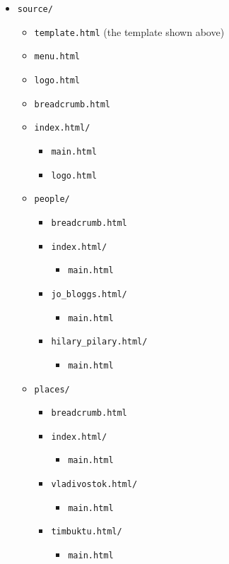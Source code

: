 \documentclass[english]{scrartcl}
\begin{document}
\begin{enumerate}
\begin{itemize}
\item \verb|source/|
  \begin{itemize}
  \item \verb|template.html| (the template shown above)
  \item \verb|menu.html|
  \item \verb|logo.html|
  \item \verb|breadcrumb.html|
  \item \verb|index.html/|
    \begin{itemize}
    \item \verb|main.html|
    \item \verb|logo.html|
    \end{itemize}
  \item \verb|people/|
    \begin{itemize}
    \item \verb|breadcrumb.html|
    \item \verb|index.html/|
      \begin{itemize}
      \item \verb|main.html|
      \end{itemize}
    \item \verb|jo_bloggs.html/|
      \begin{itemize}
      \item \verb|main.html|
      \end{itemize}
    \item \verb|hilary_pilary.html/|
      \begin{itemize}
      \item \verb|main.html|
      \end{itemize}
    \end{itemize}
  \item \verb|places/|
    \begin{itemize}
    \item \verb|breadcrumb.html|
    \item \verb|index.html/|
      \begin{itemize}
      \item \verb|main.html|
      \end{itemize}
    \item \verb|vladivostok.html/|
      \begin{itemize}
      \item \verb|main.html|
      \end{itemize}
    \item \verb|timbuktu.html/|
      \begin{itemize}
      \item \verb|main.html|
      \end{itemize}
    \end{itemize}
  \end{itemize}
\end{itemize}


\end{enumerate}
\end{document}
